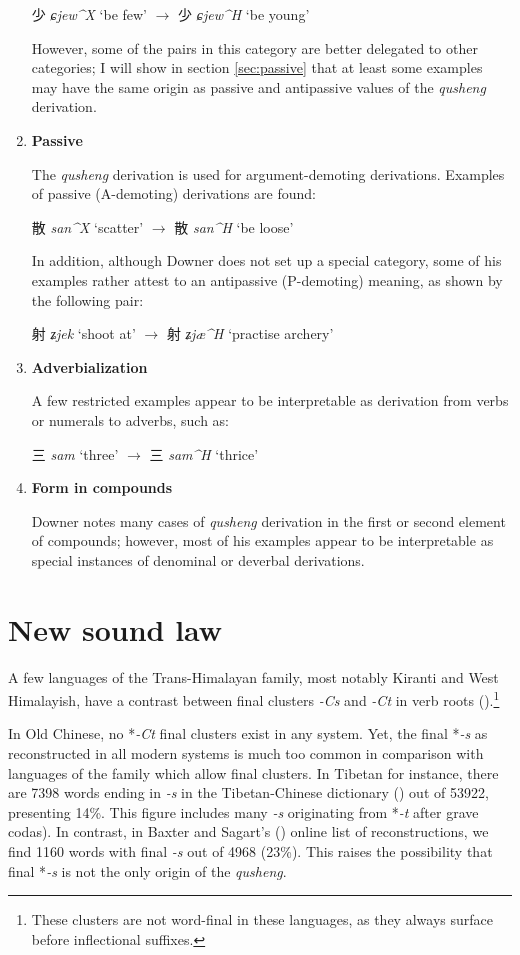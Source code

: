 \documentclass[oneside,a4paper,11pt]{article}
\newcommand{\ipa}[1]{{\phon\textit{\mbox{#1}}}}
\newcommand{\zh}[1]{{\cn#1}}
\newcommand{\ch}[3]{\zh{#1} \ipa{#2} `#3'}
\begin{document}
\begin{enumerate}
\ch{少}{ɕjew^X}{be few} $\rightarrow$ \ch{少}{ɕjew^H}{be young} 

However, some of the pairs in this category are better delegated to other categories; I will show in section \ref{sec:passive} that at least some examples may have the same origin as passive and antipassive values of the \textit{qusheng} derivation.

\item \textbf{Passive}

The \textit{qusheng} derivation is used for argument-demoting derivations. Examples of passive (A-demoting) derivations are found:

\ch{散}{san^X}{scatter} $\rightarrow$ \ch{散}{san^H}{be loose} 

In addition, although Downer does not set up a special category, some of his examples rather attest to an antipassive (P-demoting) meaning, as shown by the following pair:

\ch{射}{ʑjek}{shoot at} $\rightarrow$ \ch{射}{ʑjæ^H}{practise archery} 

\item \textbf{Adverbialization}

A few restricted examples appear to be interpretable as derivation from verbs or numerals to adverbs, such as:

\ch{三}{sam}{three} $\rightarrow$ \ch{三}{sam^H}{thrice} 

\item \textbf{Form in compounds}

Downer notes many cases of \textit{qusheng} derivation in the first or second element of compounds; however, most of his examples appear to be interpretable as special instances of denominal or deverbal derivations.

\end{enumerate}

\section{New sound law}
A few languages of the Trans-Himalayan family, most notably Kiranti and West Himalayish, have a contrast between final clusters \ipa{-Cs} and \ipa{-Ct} in verb roots (\citealt{michailovsky85dental}).\footnote{These clusters are not word-final in these languages, as they always surface before inflectional suffixes.} 

In Old Chinese, no *\ipa{-Ct} final clusters exist in any system. Yet, the final *\ipa{-s} as reconstructed in all modern systems is much too common in comparison with languages of the family which allow final clusters. In Tibetan for instance, there are 7398 words ending in \ipa{-s} in  the Tibetan-Chinese dictionary (\citealt{bodrgya}) out of 53922, presenting 14\%. This figure includes many \ipa{-s} originating from *\ipa{-t} after grave codas). In contrast, in Baxter and Sagart's (\citeyear{bs14oc}) online list of reconstructions, we find 1160 words with final \ipa{-s} out of 4968 (23\%). This raises the possibility that final *\ipa{-s} is not the only origin of the \textit{qusheng}.
\end{document}

